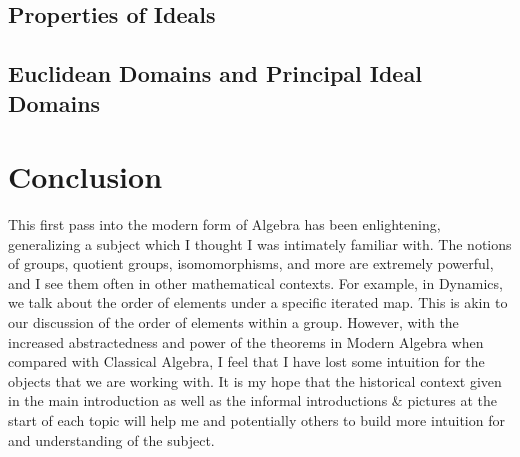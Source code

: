 \documentclass[11pt, reqno]{amsart}
\theoremstyle{plain}
\theoremstyle{definition}
\theoremstyle{example}
\begin{document}
\subsection{Properties of Ideals}

\subsection{Euclidean Domains and Principal Ideal Domains}

\section{Conclusion}

\par
This first pass into the modern form of Algebra has been enlightening, generalizing a subject which I thought I was intimately familiar with. The notions of groups, quotient groups, isomomorphisms, and more are extremely powerful, and I see them often in other mathematical contexts. For example, in Dynamics, we talk about the order of elements under a specific iterated map. This is akin to our discussion of the order of elements within a group. However, with the increased abstractedness and power of the theorems in Modern Algebra when compared with Classical Algebra, I feel that I have lost some intuition for the objects that we are working with. It is my hope that the historical context given in the main introduction as well as the informal introductions \& pictures at the start of each topic will help me and potentially others to build more intuition for and understanding of the subject.
\end{document}
